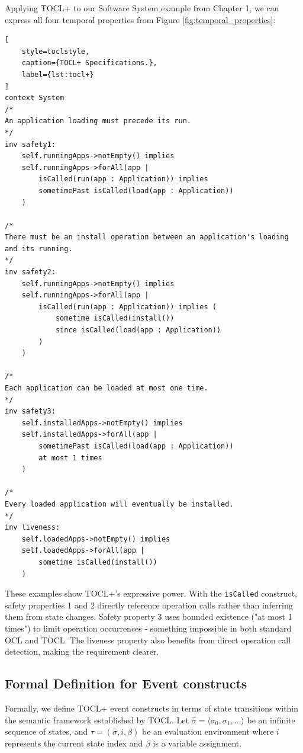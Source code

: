 Applying TOCL+ to our Software System example from Chapter 1, we can express all 
four temporal properties from Figure \ref{fig:temporal_properties}:

\begin{lstlisting}[
    style=toclstyle, 
    caption={TOCL+ Specifications.}, 
    label={lst:tocl+}
]
context System
/*
An application loading must precede its run.
*/
inv safety1: 
    self.runningApps->notEmpty() implies
    self.runningApps->forAll(app |
        isCalled(run(app : Application)) implies
        sometimePast isCalled(load(app : Application))
    )

/*
There must be an install operation between an application's loading and its running.
*/
inv safety2: 
    self.runningApps->notEmpty() implies
    self.runningApps->forAll(app |
        isCalled(run(app : Application)) implies (
            sometime isCalled(install())
            since isCalled(load(app : Application))
        )
    )

/*
Each application can be loaded at most one time.
*/
inv safety3:
    self.installedApps->notEmpty() implies
    self.installedApps->forAll(app |
        sometimePast isCalled(load(app : Application))
        at most 1 times
    )

/*
Every loaded application will eventually be installed.
*/
inv liveness:
    self.loadedApps->notEmpty() implies
    self.loadedApps->forAll(app | 
        sometime isCalled(install())
    )
\end{lstlisting}

These examples show TOCL+'s expressive power. With the \texttt{isCalled} construct, 
safety properties 1 and 2 directly reference operation calls rather than inferring 
them from state changes. Safety property 3 uses bounded existence ("at most 1 times") 
to limit operation occurrences - something impossible in both standard OCL and TOCL. 
The liveness property also benefits from direct operation call detection, making 
the requirement clearer.


\subsection{Formal Definition for Event constructs}

\hspace{1cm} Formally, we define TOCL+ event constructs in terms of state transitions 
within the semantic framework established by TOCL. Let 
$\hat{\sigma} = \langle \sigma_0, \sigma_1, \ldots \rangle$ 
be an infinite sequence of states, and 
$\tau = (\hat{\sigma}, i, \beta)$ 
be an evaluation environment where $i$ represents the current state index and $\beta$ 
is a variable assignment.

